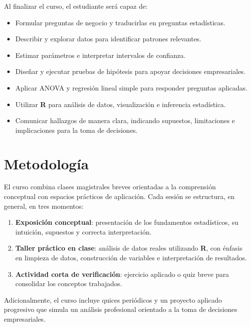 \documentclass[
  11pt,
]{article}
\providecommand{\tightlist}{%
  \setlength{\itemsep}{0pt}\setlength{\parskip}{0pt}}
\begin{document}
Al finalizar el curso, el estudiante será capaz de:

\begin{itemize}
\tightlist
\item
  Formular preguntas de negocio y traducirlas en preguntas estadísticas.
\item
  Describir y explorar datos para identificar patrones relevantes.
\item
  Estimar parámetros e interpretar intervalos de confianza.
\item
  Diseñar y ejecutar pruebas de hipótesis para apoyar decisiones
  empresariales.
\item
  Aplicar ANOVA y regresión lineal simple para responder preguntas
  aplicadas.
\item
  Utilizar \textbf{R} para análisis de datos, visualización e inferencia
  estadística.
\item
  Comunicar hallazgos de manera clara, indicando supuestos, limitaciones
  e implicaciones para la toma de decisiones.
\end{itemize}

\hypertarget{metodologuxeda}{%
\section{Metodología}\label{metodologuxeda}}

El curso combina clases magistrales breves orientadas a la comprensión
conceptual con espacios prácticos de aplicación. Cada sesión se
estructura, en general, en tres momentos:

\begin{enumerate}
\def\labelenumi{\arabic{enumi}.}
\tightlist
\item
  \textbf{Exposición conceptual}: presentación de los fundamentos
  estadísticos, su intuición, supuestos y correcta interpretación.
\item
  \textbf{Taller práctico en clase}: análisis de datos reales utilizando
  \textbf{R}, con énfasis en limpieza de datos, construcción de
  variables e interpretación de resultados.
\item
  \textbf{Actividad corta de verificación}: ejercicio aplicado o quiz
  breve para consolidar los conceptos trabajados.
\end{enumerate}

Adicionalmente, el curso incluye quices periódicos y un proyecto
aplicado progresivo que simula un análisis profesional orientado a la
toma de decisiones empresariales.
\end{document}
